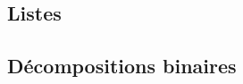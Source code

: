 

\usepackage{parcolumns}
\setlength{\parindent}{0pt}

 

\subsection{Listes}


\subsection{Décompositions binaires}

